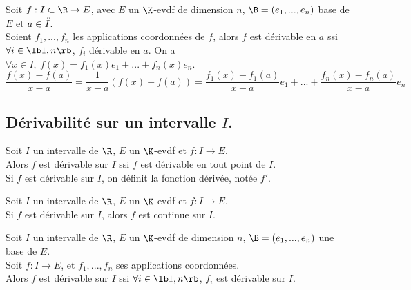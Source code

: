\documentclass[11pt]{article}
\begin{document}
\vspace*{-0.7cm}

\begin{prop}{}{}
    Soit $f:I\subset\R\to E$, avec $E$ un $\K$-evdf de dimension $n$, $\B=(e_1,...,e_n)$ base de $E$ et $a\in\accentset{\circ}{I}$.\\
    Soient $f_1,...,f_n$ les applications coordonnées de $f$, alors $f$ est dérivable en $a$ ssi $\forall i \in \lb1,n\rb$, $f_i$ dérivable en $a$.
    \tcblower
    On a $\forall x \in I, ~ f(x)=f_1(x)e_1 + ... + f_n(x)e_n$.
    \begin{equation*}
        \frac{f(x)-f(a)}{x-a}= \frac{1}{x-a}(f(x)-f(a)) = \frac{f_1(x)-f_1(a)}{x-a}e_1 + ...+ \frac{f_n(x)-f_n(a)}{x-a}e_n
    \end{equation*}
\end{prop}

\subsection{Dérivabilité sur un intervalle \texorpdfstring{$I$}{Lg}.}

\begin{defi}{}{}
    Soit $I$ un intervalle de $\R$, $E$ un $\K$-evdf et $f:I\to E$.\\
    Alors $f$ est dérivable sur $I$ ssi $f$ est dérivable en tout point de $I$.\\
    Si $f$ est dérivable sur $I$, on définit la fonction dérivée, notée $f'$.
\end{defi}

\vspace*{-0.7cm}

\begin{prop}{}{}
    Soit $I$ un intervalle de $\R$, $E$ un $\K$-evdf et $f:I\to E$.\\
    Si $f$ est dérivable sur $I$, alors $f$ est continue sur $I$.
\end{prop}

\vspace*{-0.7cm}

\begin{prop}{}{}
    Soit $I$ un intervalle de $\R$, $E$ un $\K$-evdf de dimension $n$, $\B=(e_1,...,e_n)$ une base de $E$.\\
    Soit $f:I\to E$, et $f_1,...,f_n$ ses applications coordonnées.\\
    Alors $f$ est dérivable sur $I$ ssi $\forall i \in \lb1,n\rb$, $f_i$ est dérivable sur $I$.
\end{prop}
\end{document}
